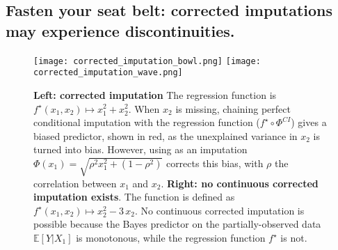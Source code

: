 \documentclass{article}
\theoremstyle{plain}
\begin{document}
\subsection{Fasten your seat belt: corrected imputations may experience discontinuities.}


\begin{figure}[t]
    \texttt{[image: corrected\_imputation\_bowl.png]}%
        \hfill%
    \texttt{[image: corrected\_imputation\_wave.png]}%
    \caption{\textbf{Left: corrected imputation} The regression function is $f^\star(x_1, x_2) \mapsto x_1^2 + x_2^2$. When $x_2$ is missing, chaining perfect conditional imputation with the regression function ($f^\star \circ \Phi^{CI}$) gives a biased predictor, shown in red, as the unexplained variance in $x_2$ is turned into bias. However, using as an imputation $\Phi(x_1) = \sqrt{\rho^2 x_1^2 + (1-\rho^2)}$ corrects this bias, with $\rho$ the correlation between $x_1$ and $x_2$.
    \textbf{Right: no continuous corrected imputation exists}. The
function is defined as $f^\star(x_1, x_2) \mapsto x_2^2 -
3\,x_2$. No continuous corrected imputation is possible because the Bayes
predictor on the partially-observed data $\mathbb{E}[Y|X_1]$ is
monotonous, while the regression function $f^\star$ is not.}
    \label{fig:2d_examples}
\end{figure}
\end{document}

